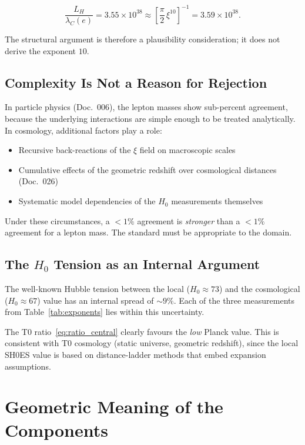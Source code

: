 \begin{equation}
    \frac{L_H}{\lambda_C(e)} = 3.55\times10^{38} \approx \left[\frac{\pi}{2}\,\xi^{10}\right]^{-1} = 3.59\times10^{38}.
\end{equation}

The structural argument is therefore a plausibility consideration; it does not
derive the exponent $10$.

\subsection{Complexity Is Not a Reason for Rejection}

In particle physics (Doc.~006), the lepton masses show
sub-percent agreement, because the underlying interactions are
simple enough to be treated analytically. In cosmology,
additional factors play a role:

\begin{itemize}
    \item Recursive back-reactions of the $\xi$ field on macroscopic scales
    \item Cumulative effects of the geometric redshift over
          cosmological distances (Doc.~026)
    \item Systematic model dependencies of the $H_0$ measurements themselves
\end{itemize}

Under these circumstances, a $<1\%$ agreement is
\emph{stronger} than a $<1\%$ agreement for a lepton mass.
The standard must be appropriate to the domain.

\subsection{The \texorpdfstring{$H_0$}{H0} Tension as an Internal Argument}

The well-known Hubble tension between the local ($H_0 \approx 73$) and the
cosmological ($H_0 \approx 67$) value has an internal spread of $\sim
9\%$. Each of the three measurements from
Table~\ref{tab:exponents} lies within this uncertainty.

The T0 ratio~\eqref{eq:ratio_central} clearly favours the
\emph{low} Planck value. This is consistent with T0 cosmology
(static universe, geometric redshift), since the local
SH0ES value is based on distance-ladder methods that embed
expansion assumptions.

\section{Geometric Meaning of the Components}
\label{sec:geometrie}

